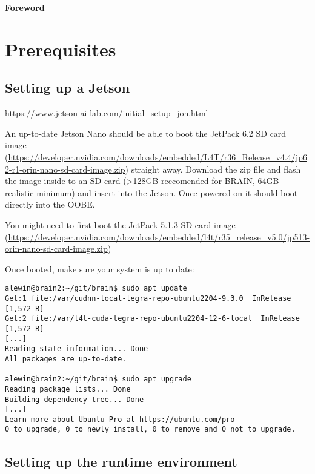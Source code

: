 \documentclass{article}
\begin{document}
\frontmatter
\tableofcontents
\clearpage

{\huge {\bf Foreword}}

\section{Prerequisites}

\subsection{Setting up a Jetson}

https://www.jetson-ai-lab.com/initial_setup_jon.html

An up-to-date Jetson Nano should be able to boot the JetPack 6.2 SD card image (\href{https://developer.nvidia.com/downloads/embedded/L4T/r36_Release_v4.4/jp62-r1-orin-nano-sd-card-image.zip}{https://developer.nvidia.com/downloads/embedded/L4T/r36_Release_v4.4/jp62-r1-orin-nano-sd-card-image.zip}) straight away. Download the zip file and flash the image inside to an SD card (>128GB reccomended for BRAIN, 64GB realistic minimum) and insert into the Jetson. Once powered on it should boot directly into the OOBE.

You might need to first boot the JetPack 5.1.3 SD card image (\href{https://developer.nvidia.com/downloads/embedded/l4t/r35_release_v5.0/jp513-orin-nano-sd-card-image.zip}{https://developer.nvidia.com/downloads/embedded/l4t/r35_release_v5.0/jp513-orin-nano-sd-card-image.zip})

Once booted, make sure your system is up to date:

\begin{lstlisting}
alewin@brain2:~/git/brain$ sudo apt update
Get:1 file:/var/cudnn-local-tegra-repo-ubuntu2204-9.3.0  InRelease [1,572 B]
Get:2 file:/var/l4t-cuda-tegra-repo-ubuntu2204-12-6-local  InRelease [1,572 B]
[...]
Reading state information... Done
All packages are up-to-date.

alewin@brain2:~/git/brain$ sudo apt upgrade
Reading package lists... Done
Building dependency tree... Done
[...]
Learn more about Ubuntu Pro at https://ubuntu.com/pro
0 to upgrade, 0 to newly install, 0 to remove and 0 not to upgrade.
\end{lstlisting}

\subsection{Setting up the runtime environment}
\end{document}
